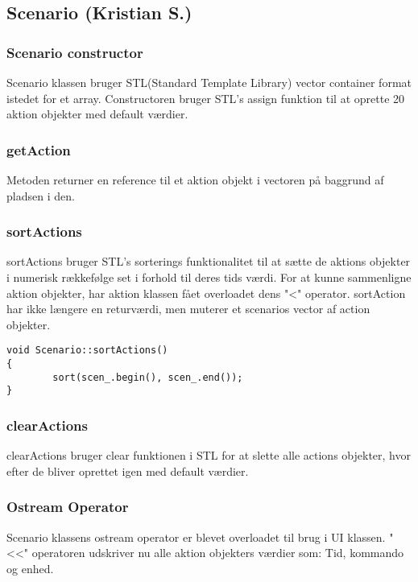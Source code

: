 \subsection{Scenario (Kristian S.)}

\subsubsection{Scenario constructor}

Scenario klassen bruger STL(Standard Template Library) vector container format istedet for et array. Constructoren bruger STL's assign funktion til at oprette 20 aktion objekter med default værdier.

\subsubsection{getAction}

Metoden returner en reference til et aktion objekt i vectoren på baggrund af pladsen i den.

\subsubsection{sortActions}

sortActions bruger STL's sorterings funktionalitet til at sætte de aktions objekter i numerisk rækkefølge set i forhold til deres tids værdi. For at kunne sammenligne aktion objekter, har aktion klassen fået overloadet dens "<" operator. sortAction har ikke længere en returværdi, men muterer et scenarios vector af action objekter.

\begin{lstlisting}
void Scenario::sortActions()
{
		sort(scen_.begin(), scen_.end());
}
\end{lstlisting}

\subsubsection{clearActions}

clearActions bruger clear funktionen i STL for at slette alle actions objekter, hvor efter de bliver oprettet igen med default værdier.


\subsubsection{Ostream Operator}

Scenario klassens ostream operator er blevet overloadet til brug i UI klassen. "<<" operatoren udskriver nu alle aktion objekters værdier som: Tid, kommando og enhed.


\clearpage